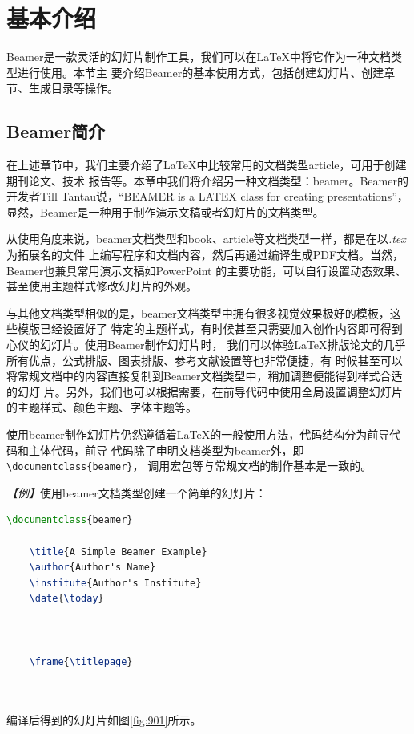 \section{基本介绍}

Beamer是一款灵活的幻灯片制作工具，我们可以在LaTeX中将它作为一种文档类型进行使用。本节主
要介绍Beamer的基本使用方式，包括创建幻灯片、创建章节、生成目录等操作。

\subsection{Beamer简介}

在上述章节中，我们主要介绍了LaTeX中比较常用的文档类型article，可用于创建期刊论文、技术
报告等。本章中我们将介绍另一种文档类型：beamer。Beamer的开发者Till Tantau说，“BEAMER is a LATEX class for creating presentations”，显然，Beamer是一种用于制作演示文稿或者幻灯片的文档类型。

从使用角度来说，beamer文档类型和book、article等文档类型一样，都是在以\emph{.tex}为拓展名的文件
上编写程序和文档内容，然后再通过编译生成PDF文档。当然，Beamer也兼具常用演示文稿如PowerPoint
的主要功能，可以自行设置动态效果、甚至使用主题样式修改幻灯片的外观。

与其他文档类型相似的是，beamer文档类型中拥有很多视觉效果极好的模板，这些模版已经设置好了
特定的主题样式，有时候甚至只需要加入创作内容即可得到心仪的幻灯片。使用Beamer制作幻灯片时，
我们可以体验LaTeX排版论文的几乎所有优点，公式排版、图表排版、参考文献设置等也非常便捷，有
时候甚至可以将常规文档中的内容直接复制到Beamer文档类型中，稍加调整便能得到样式合适的幻灯
片。另外，我们也可以根据需要，在前导代码中使用全局设置调整幻灯片的主题样式、颜色主题、字体主题等。

使用beamer制作幻灯片仍然遵循着LaTeX的一般使用方法，代码结构分为前导代码和主体代码，前导
代码除了申明文档类型为beamer外，即\texttt{\textbackslash{}documentclass\{beamer\}}，
调用宏包等与常规文档的制作基本是一致的。

\emph{【例】}使用beamer文档类型创建一个简单的幻灯片：
\begin{lstlisting}[language=TeX]
    \documentclass{beamer}

    \title{A Simple Beamer Example}
    \author{Author's Name}
    \institute{Author's Institute}
    \date{\today} 

    

    \frame{\titlepage}

    
\end{lstlisting}

编译后得到的幻灯片如图\ref{fig:901}所示。

